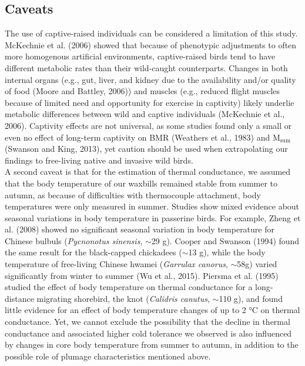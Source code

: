 \documentclass[10pt, twoside]{book} %
\begin{document}
\subsection{Caveats}

The use of captive-raised individuals can be considered a limitation of this study. McKechnie et al. (2006) showed that because of phenotypic adjustments to often more homogenous artificial environments, captive-raised birds tend to have different metabolic rates than their wild-caught counterparts. Changes in both internal organs (e.g., gut, liver, and kidney due to the availability and/or quality of food (Moore and Battley, 2006)) and muscles (e.g., reduced flight muscles because of limited need and opportunity for exercise in captivity) likely underlie metabolic differences between wild and captive individuals (McKechnie et al., 2006). Captivity effects are not universal, as some studies found only a small or even no effect of long-term captivity on BMR (Weathers et al., 1983) and M$_{\text{sum}}$ (Swanson and King, 2013), yet caution should be used when extrapolating our findings to free-living native and invasive wild birds.\\

A second caveat is that for the estimation of thermal conductance, we assumed that the body temperature of our waxbills remained stable from summer to autumn, as because of difficulties with thermocouple attachment, body temperatures were only measured in summer. Studies show mixed evidence about seasonal variations in body temperature in passerine birds. For example, Zheng et al. (2008) showed no significant seasonal variation in body temperature for Chinese bulbuls (\textit{Pycnonotus sinensis}, $\sim$29 g). Cooper and Swanson (1994) found the same result for the black-capped chickadees ($\sim$13 g), while the body temperature of free-living Chinese hwamei (\textit{Garrulax canorus}, $\sim$58g) varied significantly from winter to summer (Wu et al., 2015). Piersma et al. (1995) studied the effect of body temperature on thermal conductance for a long-distance migrating shorebird, the knot (\textit{Calidris canutus}, $\sim$110 g), and found little evidence for an effect of body temperature changes of up to 2 °C on thermal conductance. Yet, we cannot exclude the possibility that the decline in thermal conductance and associated higher cold tolerance we observed is also influenced by changes in core body temperature from summer to autumn, in addition to the possible role of plumage characteristics mentioned above.\\
\end{document}
